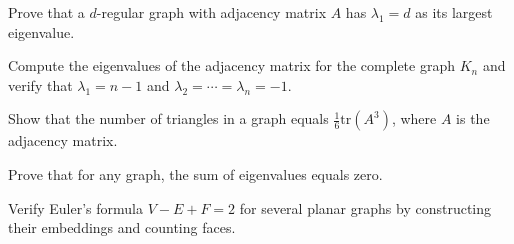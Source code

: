 \begin{exercise}
Prove that a $d$-regular graph with adjacency matrix $A$ has $\lambda_1 = d$ as its largest eigenvalue.
\end{exercise}

\begin{exercise}[Computational]
Compute the eigenvalues of the adjacency matrix for the complete graph $K_n$ and verify that $\lambda_1 = n-1$ and $\lambda_2 = \cdots = \lambda_n = -1$.
\end{exercise}

\begin{exercise}
Show that the number of triangles in a graph equals $\frac{1}{6}\text{tr}(A^3)$, where $A$ is the adjacency matrix.
\end{exercise}

\begin{exercise}
Prove that for any graph, the sum of eigenvalues equals zero.
\end{exercise}

\begin{exercise}[Computational]
Verify Euler's formula $V - E + F = 2$ for several planar graphs by constructing their embeddings and counting faces.
\end{exercise}
